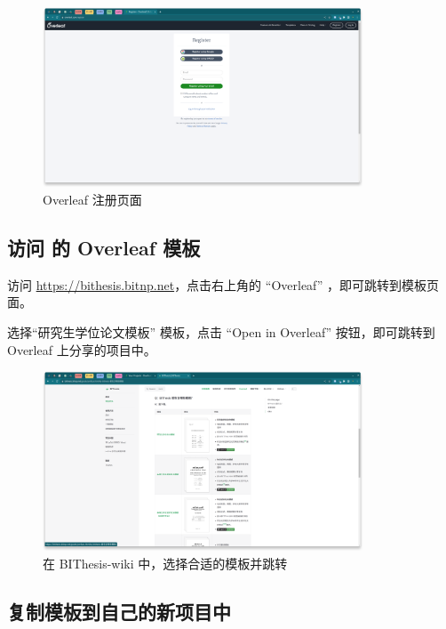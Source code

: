 \begin{figure}[H]
  \begin{center}
    \includegraphics[width=0.85\textwidth]{imgs/overleaf-register.png}
  \end{center}
  \caption{Overleaf 注册页面}
  \label{fig:overleaf-register}
\end{figure}


\subsection{访问 \BIThesis 的 Overleaf 模板}

访问 \url{https://bithesis.bitnp.net}，点击右上角的 ``Overleaf'' ，即可跳转到模板页面。

选择``研究生学位论文模板'' 模板，点击 ``Open in Overleaf'' 按钮，即可跳转到 Overleaf 上分享的项目中。

\begin{figure}[H]
  \begin{center}
    \includegraphics[width=0.85\textwidth]{imgs/overleaf-choose-template.png}
  \end{center}
  \caption{在 BIThesis-wiki 中，选择合适的模板并跳转}
  \label{fig:overleaf-template}
\end{figure}

\subsection{复制模板到自己的新项目中}


